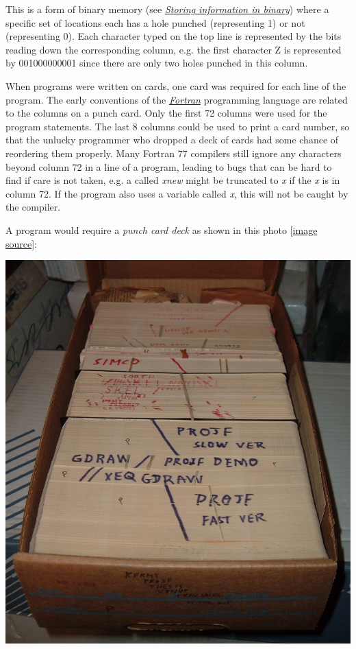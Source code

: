 \documentclass[letterpaper,10pt,english]{sphinxmanual}
\begin{document}
This is a form of binary memory (see {\hyperref[memory:memory]{\emph{Storing information in binary}}})
where a specific set of locations each has a
hole punched (representing 1) or not (representing 0).
Each character typed on the top line is represented by the bits reading down
the corresponding column, e.g. the first character Z is represented by
001000000001 since there are only two holes punched in this column.

When programs were written on cards, one card was required for each line of
the program.  The early conventions of the {\hyperref[fortran:fortran]{\emph{Fortran}}} programming
language are related to the columns on a punch card.
Only the first 72 columns were used for the program statements.  The last 8
columns could be used to print a card number, so that the unlucky programmer
who dropped a deck of cards had some chance of reordering them properly.
Many Fortran 77  compilers still ignore any characters beyond column 72 in a
line of a program, leading to bugs that can be hard to find if care is not
taken, e.g. a called \emph{xnew} might be truncated to \emph{x} if the \emph{x} is in
column 72.  If the program also uses a variable called \emph{x}, this will not be
caught by the compiler.

A program would require a \emph{punch card deck} as shown in this photo
{[}\href{http://en.wikipedia.org/wiki/File:PunchCardDecks.agr.jpg}{image source}{]}:

\includegraphics[width=15cm]{PunchCardDecks-agr.jpg}
\end{document}
